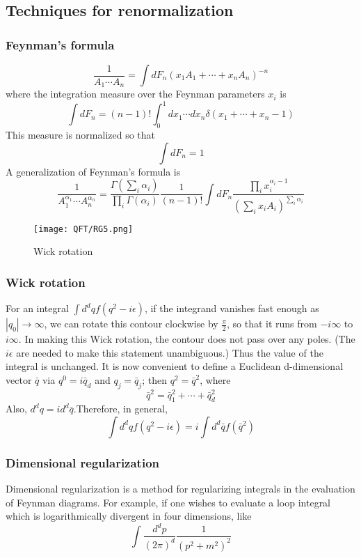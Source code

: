 \subsection{Techniques for renormalization}
\subsubsection{Feynman's formula}
\begin{newthem}
\[ \frac{1}{A_1 \cdots A_n} = \int dF_n (x_1A_1+ \cdots +x_nA_n)^{-n}\]
where the integration measure over the Feynman parameters $x_i$ is
\[\int dF_n = (n-1)! \int_0^1 dx_1 \cdots dx_n \delta(x_1+\cdots+x_n-1)\]
This measure is normalized so that
\[\int dF_n = 1\]
A generalization of Feynman's formula is
\[ \frac{1}{A_1^{\alpha_1} \cdots A_n^{\alpha_n}} = \frac{\Gamma(\sum_i \alpha_i)}{\prod_i \Gamma(\alpha_i)} \frac{1}{(n-1)!}\int dF_n \frac{\prod_i x_i^{\alpha_i-1}}{(\sum_i x_i A_i)^{\sum_i \alpha_i}}\]
\end{newthem}
\begin{figure}[!h]
\centering
\texttt{[image: QFT/RG5.png]}
\caption{Wick rotation}
\end{figure}

\subsubsection{Wick rotation}
For an integral $\int d^d q f(q^2-i\epsilon)$, if the integrand vanishes fast enough as $|q_0| \to \infty$, we can rotate this contour clockwise by $\frac{\pi}{2}$, so that it runs from $-i\infty$ to $i\infty$. In making this Wick rotation, the contour does not pass over any poles. (The $i\epsilon$ are needed to make this statement unambiguous.) Thus the value of the integral is unchanged. It is now convenient to define a Euclidean d-dimensional vector $\bar{q}$ via $q^0 = i \bar{q}_d$ and $q_j = \bar{q}_j$; then $q^2 = \bar{q}^2$, where
\[\bar{q}^2 = \bar{q}_1^2 + \cdots + \bar{q}_d^2\]
Also, $d^dq = id^d \bar{q}$.Therefore, in general,
\[\int d^d q f(q^2-i\epsilon) = i \int d^d\bar{q} f(\bar{q}^2)\]

\subsubsection{Dimensional regularization}
Dimensional regularization is a method for regularizing integrals in the evaluation of Feynman diagrams. For example, if one wishes to evaluate a loop integral which is logarithmically divergent in four dimensions, like
\[\int {\frac {d^{d}p}{(2\pi )^{d}}}{\frac {1}{\left(p^{2}+m^{2}\right)^{2}}}\]

